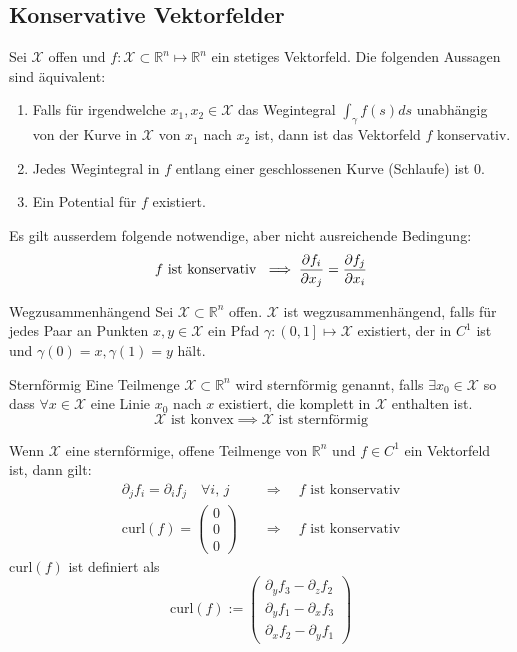 \documentclass[a4paper,10pt]{article}
\def\R{\mathbb{R}}
\def\X{\mathcal{X}}
\begin{document}
\subsection{Konservative Vektorfelder}
Sei \(\X\) offen und \(f: \X \subset \R^n \mapsto \R^n\) ein stetiges Vektorfeld. Die folgenden Aussagen sind äquivalent:
\begin{enumerate}
  \item Falls für irgendwelche \(x_1, x_2 \in \X\) das Wegintegral \(\int_\gamma f(s) ds\) unabhängig von der Kurve in \(\X\) von \(x_1\) nach \(x_2\) ist, dann ist das Vektorfeld \(f\) konservativ.
  \item Jedes Wegintegral in \(f\) entlang einer geschlossenen Kurve (Schlaufe) ist 0.
  \item Ein Potential für \(f\) existiert.
\end{enumerate}
Es gilt ausserdem folgende notwendige, aber nicht ausreichende Bedingung:
\[f \text{ ist konservativ }\implies \pdv{f_i}{x_j} = \pdv{f_j}{x_i}\]

\begin{subbox}{Wegzusammenhängend}
  Sei \(\X \subset \R^n\) offen. \(\X\) ist wegzusammenhängend, falls für jedes Paar an Punkten \(x, y \in \X\) ein Pfad \(\gamma : \left(0,1\right] \mapsto \X\) existiert, der in \(C^1\) ist und \(\gamma(0) = x, \gamma(1) = y\) hält.
\end{subbox}

\begin{subbox}{Sternförmig}
  Eine Teilmenge \(\X \subset \R^n\) wird sternförmig genannt, falls \(\exists x_0 \in \X\) so dass \(\forall x \in \X\) eine Linie \(x_0\) nach \(x\) existiert, die komplett in \(\X\) enthalten ist. 
  \[\X \text{ ist konvex} \implies \X \text{ ist sternförmig}\]
\end{subbox}
Wenn \(\X\) eine sternförmige, offene Teilmenge von \(\R^n\) und \(f \in C^1\) ein Vektorfeld ist, dann gilt:
\begin{align*}
  \partial_j f_i = \partial_i f_j \quad \forall i,\, j
  \quad &\Rightarrow \quad \text{$f$ ist konservativ}\\
  \text{curl}(f) = \begin{pmatrix}
    0\\0\\0
  \end{pmatrix}
  \quad &\Rightarrow \quad \text{$f$ ist konservativ}
\end{align*}
\(\text{curl}(f)\) ist definiert als
\[\text{curl}(f) := \begin{pmatrix}
  \partial_y f_3 - \partial_z f_2 \\
  \partial_y f_1 - \partial_x f_3 \\
  \partial_x f_2 - \partial_y f_1
\end{pmatrix}\]
\end{document}
